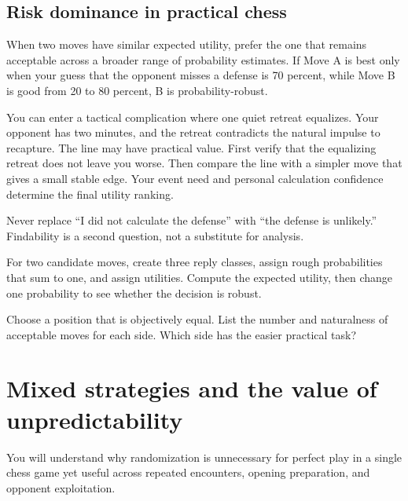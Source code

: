 \section{Risk dominance in practical chess}
When two moves have similar expected utility, prefer the one that remains acceptable across a broader range of probability estimates. If Move A is best only when your guess that the opponent misses a defense is 70 percent, while Move B is good from 20 to 80 percent, B is probability-robust.

\begin{workedbox}[title={Worked example: the hidden defense}]
You can enter a tactical complication where one quiet retreat equalizes. Your opponent has two minutes, and the retreat contradicts the natural impulse to recapture. The line may have practical value. First verify that the equalizing retreat does not leave you worse. Then compare the line with a simpler move that gives a small stable edge. Your event need and personal calculation confidence determine the final utility ranking.
\end{workedbox}

\begin{warningbox}
Never replace ``I did not calculate the defense'' with ``the defense is unlikely.'' Findability is a second question, not a substitute for analysis.
\end{warningbox}

\begin{exercise}
For two candidate moves, create three reply classes, assign rough probabilities that sum to one, and assign utilities. Compute the expected utility, then change one probability to see whether the decision is robust.
\end{exercise}

\begin{exercise}
Choose a position that is objectively equal. List the number and naturalness of acceptable moves for each side. Which side has the easier practical task?
\end{exercise}


\chapter{Mixed strategies and the value of unpredictability}
\begin{learningbox}
You will understand why randomization is unnecessary for perfect play in a single chess game yet useful across repeated encounters, opening preparation, and opponent exploitation.
\end{learningbox}

